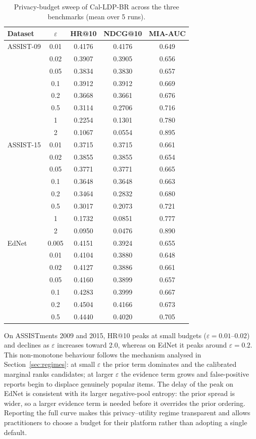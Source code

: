 \documentclass[pdflatex,sn-basic,Numbered]{sn-jnl}
\theoremstyle{plain}
\theoremstyle{remark}
\theoremstyle{definition}
\newcommand{\eps}{\varepsilon}
\begin{document}
\begin{table}[t]
\caption{Privacy-budget sweep of Cal-LDP-BR across the three benchmarks (mean over 5 runs).}
\label{tab:sweep}
\small
\begin{tabular}{@{}lcccc@{}}
\toprule
Dataset & $\eps$ & HR@10 & NDCG@10 & MIA-AUC \\
\midrule
ASSIST-09 & 0.01 & 0.4176 & 0.4176 & 0.649 \\
 & 0.02 & 0.3907 & 0.3905 & 0.656 \\
 & 0.05 & 0.3834 & 0.3830 & 0.657 \\
 & 0.1 & 0.3912 & 0.3912 & 0.669 \\
 & 0.2 & 0.3668 & 0.3661 & 0.676 \\
 & 0.5 & 0.3114 & 0.2706 & 0.716 \\
 & 1 & 0.2254 & 0.1301 & 0.780 \\
 & 2 & 0.1067 & 0.0554 & 0.895 \\
\midrule
ASSIST-15 & 0.01 & 0.3715 & 0.3715 & 0.661 \\
 & 0.02 & 0.3855 & 0.3855 & 0.654 \\
 & 0.05 & 0.3771 & 0.3771 & 0.665 \\
 & 0.1 & 0.3648 & 0.3648 & 0.663 \\
 & 0.2 & 0.3464 & 0.2832 & 0.680 \\
 & 0.5 & 0.3017 & 0.2073 & 0.721 \\
 & 1 & 0.1732 & 0.0851 & 0.777 \\
 & 2 & 0.0950 & 0.0476 & 0.890 \\
\midrule
EdNet & 0.005 & 0.4151 & 0.3924 & 0.655 \\
 & 0.01 & 0.4104 & 0.3880 & 0.648 \\
 & 0.02 & 0.4127 & 0.3886 & 0.661 \\
 & 0.05 & 0.4160 & 0.3899 & 0.657 \\
 & 0.1 & 0.4283 & 0.3999 & 0.667 \\
 & 0.2 & 0.4504 & 0.4166 & 0.673 \\
 & 0.5 & 0.4440 & 0.4020 & 0.705 \\
\bottomrule
\end{tabular}
\end{table}

On ASSISTments 2009 and 2015, HR@10 peaks at small budgets ($\eps=0.01$--$0.02$) and declines as $\eps$ increases toward 2.0, whereas on EdNet it peaks around $\eps=0.2$. This non-monotone behaviour follows the mechanism analysed in Section~\ref{sec:regimes}: at small $\eps$ the prior term dominates and the calibrated marginal ranks candidates; at larger $\eps$ the evidence term grows and false-positive reports begin to displace genuinely popular items. The delay of the peak on EdNet is consistent with its larger negative-pool entropy: the prior spread is wider, so a larger evidence term is needed before it overrides the prior ordering. Reporting the full curve makes this privacy--utility regime transparent and allows practitioners to choose a budget for their platform rather than adopting a single default.
\end{document}
